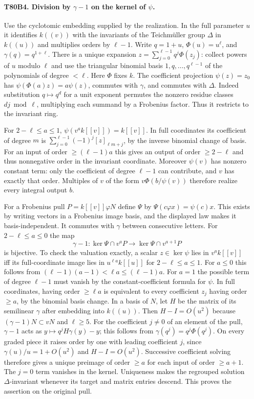 \paragraph{T80B4. Division by $\gamma-1$ on the kernel of $\psi$.}
Use the cyclotomic embedding supplied by the realization. In the full
parameter $u$ it identifies $k((v))$ with the invariants of the
Teichm\"uller group $\Delta$ in $k((u))$ and multiplies orders by
$\ell-1$. Write $q=1+u$, $\Phi(u)=u^\ell$, and
$\gamma(q)=q^{1+\ell}$. There is a unique expansion
$z=\sum_{j=0}^{\ell-1}q^j\Phi(z_j)$: collect powers of $u$ modulo
$\ell$ and use the triangular binomial basis $1,q,\ldots,q^{\ell-1}$
of the polynomials of degree $<\ell$. Here $\Phi$ fixes $k$. The
coefficient projection $\psi(z)=z_0$ has
$\psi(\Phi(a)z)=a\psi(z)$, commutes with $\gamma$, and commutes with
$\Delta$. Indeed substitution $q\mapsto q^d$ for a unit exponent
permutes the nonzero residue classes $dj\bmod\ell$, multiplying each
summand by a Frobenius factor. Thus it restricts to the invariant ring.

For $2-\ell\le a\le1$, $\psi(v^ak[[v]])=k[[v]]$. In full
coordinates its coefficient of degree $m$ is
$\sum_{j=0}^{\ell-1}(-1)^j[z]_{\ell m+j}$, by the inverse binomial
change of basis. For an input of order $\ge(\ell-1)a$ this gives an
output of order $\ge 2-\ell$ and thus nonnegative order in the
invariant coordinate. Moreover $\psi(v)$ has nonzero constant term:
only the coefficient of degree $\ell-1$ can contribute, and $v$ has
exactly that order. Multiples of $v$ of the form
$v\Phi(b/\psi(v))$ therefore realize every integral output $b$.

For a Frobenius pull $P=k[[v]]\varphi N$ define $\Psi$ by
$\Psi(c\varphi x)=\psi(c)x$. This exists by writing vectors in a
Frobenius image basis, and the displayed law makes it basis-independent.
It commutes with $\gamma$ between consecutive letters. For
$2-\ell\le a\le0$ the map
\[
 \gamma-1:\ker\Psi\cap v^aP\longrightarrow
                  \ker\Psi\cap v^{a+1}P
\]
is bijective. To check the valuation exactly, a scalar $z\in\ker\psi$
lies in $v^a k[[v]]$ iff its full-coordinate image lies in
$u^{\ell a}k[[u]]$ for $2-\ell\le a\le1$. For $a\le0$ this follows
from $(\ell-1)(a-1)<\ell a\le(\ell-1)a$. For $a=1$ the
possible term of degree $\ell-1$ must vanish by the constant-coefficient
formula for $\psi$. In full coordinates, having order $\ge\ell a$ is
equivalent to every coefficient $z_j$ having order $\ge a$, by the
binomial basis change. In a basis of $N$, let $H$ be the matrix of its
semilinear $\gamma$ after embedding into $k((u))$. Then $H-I=O(u^2)$
because $(\gamma-1)N\subset vN$ and $\ell\ge5$. For the coefficient
$j\ne0$ of an element of the pull, $\gamma-1$ acts as
$y\mapsto q^j H\gamma(y)-y$; this follows from
$\gamma(q^j)=q^j\Phi(q^j)$. On every graded piece it raises order by
one with leading coefficient $j$, since $\gamma(u)/u=1+O(u^2)$
and $H-I=O(u^2)$. Successive coefficient solving therefore gives a
unique preimage of order $\ge a$ for each input of order $\ge a+1$.
The $j=0$ term vanishes in the kernel. Uniqueness makes the regrouped
solution $\Delta$-invariant whenever its target and matrix entries
descend. This proves the assertion on the original pull.

